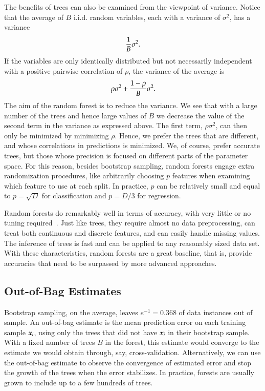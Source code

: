 \begin{refsection}
The benefits of trees can also be examined from the viewpoint of variance. Notice that the average of $B$ i.i.d. random variables, each with a variance of $\sigma^2$, has a variance
$${1\over B}\sigma^2.$$
If the variables are only identically distributed but not necessarily independent with a positive pairwise correlation of $\rho$, the variance of the average is
$$\rho\sigma^2+{1-\rho\over B}\sigma^2.$$
The aim of the random forest is to reduce the variance. We see that with a large number of the trees and hence large values of $B$ we decrease the value of the second term in the variance as expressed above. The first term, $\rho\sigma^2$, can then only be minimized by minimizing $\rho$. Hence, we prefer the trees that are different, and whose correlations in predictions is minimized. We, of course, prefer accurate trees, but those whose precision is focused on different parts of the parameter space. For this reason, besides bootstrap sampling, random forests engage extra randomization procedures, like arbitrarily choosing $p$ features when examining which feature to use at each split. In practice, $p$ can be relatively small and equal to $p=\sqrt{D}$ for classification and $p=D/3$ for regression.

Random forests do remarkably well in terms of accuracy, with very little or no tuning required~\citep{Fernandez-Delgado2014}. Just like trees, they require almost no data preprocessing, can treat both continuous and discrete features, and can easily handle missing values. The inference of trees is fast and can be applied to any reasonably sized data set. With these characteristics, random forests are a great baseline, that is, provide accuracies that need to be surpassed by more advanced approaches.

\subsection*{Out-of-Bag Estimates}

Bootstrap sampling, on the average, leaves $e^{-1}=0.368$ of data instances out of sample. An out-of-bag estimate is the mean prediction error on each training sample $\boldsymbol{x}_i$, using only the trees that did not have $\boldsymbol{x}_i$ in their bootstrap sample. With a fixed number of trees $B$ in the forest, this estimate would converge to the estimate we would obtain through, say, cross-validation. Alternatively, we can use the out-of-bag estimate to observe the convergence of estimated error and stop the growth of the trees when the error stabilizes. In practice, forests are usually grown to include up to a few hundreds of trees.


\end{refsection}

